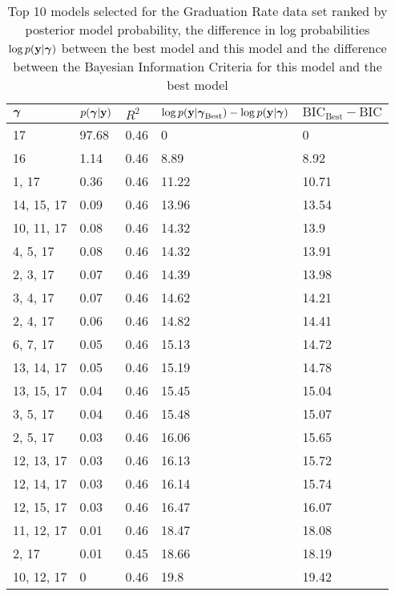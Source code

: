 \documentclass{amsart}
\begin{document}
\begin{table}
\label{tab:numerical_results_gradrate}
\caption{Top 10 models selected for the Graduation Rate data set ranked by posterior model probability, the
					difference in log probabilities $\log p({\bf y}|{\boldsymbol \gamma})$ between the best model and this model and the difference between the Bayesian Information Criteria for this model and the best model}
\begin{tabular}{|l|llll|}
\hline
${\boldsymbol \gamma}$ & $p({\boldsymbol \gamma}|{\bf y})$ & $R^2$ & $\log p({\bf y} | {\boldsymbol \gamma}_\text{Best}) - \log p({\bf y} | {\boldsymbol \gamma})$ & $\text{BIC}_\text{Best} - \text{BIC}$ \\
\hline
17&  97.68&  0.46&  0&  0\\
16&  1.14&  0.46&  8.89&  8.92\\
1, 17&  0.36&  0.46&  11.22&  10.71\\
14, 15, 17&  0.09&  0.46&  13.96&  13.54\\
10, 11, 17&  0.08&  0.46&  14.32&  13.9\\
4, 5, 17&  0.08&  0.46&  14.32&  13.91\\
2, 3, 17&  0.07&  0.46&  14.39&  13.98\\
3, 4, 17&  0.07&  0.46&  14.62&  14.21\\
2, 4, 17&  0.06&  0.46&  14.82&  14.41\\
6, 7, 17&  0.05&  0.46&  15.13&  14.72\\
13, 14, 17&  0.05&  0.46&  15.19&  14.78\\
13, 15, 17&  0.04&  0.46&  15.45&  15.04\\
3, 5, 17&  0.04&  0.46&  15.48&  15.07\\
2, 5, 17&  0.03&  0.46&  16.06&  15.65\\
12, 13, 17&  0.03&  0.46&  16.13&  15.72\\
12, 14, 17&  0.03&  0.46&  16.14&  15.74\\
12, 15, 17&  0.03&  0.46&  16.47&  16.07\\
11, 12, 17&  0.01&  0.46&  18.47&  18.08\\
2, 17&  0.01&  0.45&  18.66&  18.19\\
10, 12, 17&  0&  0.46&  19.8&  19.42\\
\hline
\end{tabular}
\end{table}
\end{document}
